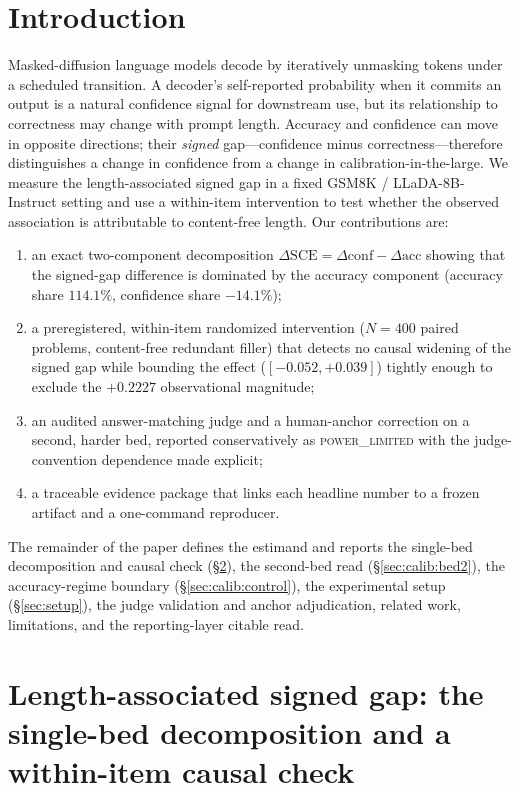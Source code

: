 \documentclass{article}
\begin{document}
\section{Introduction}
\label{sec:intro}
Masked-diffusion language models decode by iteratively unmasking tokens under a
scheduled transition.  A decoder's self-reported probability when it commits an output
is a natural confidence signal for downstream use, but its relationship to correctness
may change with prompt length.  Accuracy and confidence can move in opposite directions;
their \emph{signed} gap---confidence minus correctness---therefore distinguishes a
change in confidence from a change in calibration-in-the-large.  We measure the
length-associated signed gap in a fixed GSM8K \citep{cobbe2021gsm8k} /
LLaDA-8B-Instruct \citep{nie2025large} setting and use a within-item intervention to test
whether the observed association is attributable to content-free length.  Our
contributions are:
\begin{enumerate}
\item an exact two-component decomposition $\Delta\mathrm{SCE}=\Delta\mathrm{conf}-\Delta\mathrm{acc}$
showing that the signed-gap difference is dominated by the accuracy component
(accuracy share $114.1\%$, confidence share $-14.1\%$);
\item a preregistered, within-item randomized intervention
($N{=}400$ paired problems, content-free redundant filler) that detects no causal
widening of the signed gap while bounding the effect
($[-0.052,+0.039]$) tightly enough to exclude the $+0.2227$ observational magnitude;
\item an audited answer-matching judge and a human-anchor correction on a second,
harder bed, reported conservatively as \textsc{power\_limited} with the
judge-convention dependence made explicit;
\item a traceable evidence package that links each headline number to a frozen artifact
and a one-command reproducer.
\end{enumerate}
The remainder of the paper defines the estimand and reports the single-bed
decomposition and causal check (\S\ref{sec:calib}), the second-bed read
(\S\ref{sec:calib:bed2}), the accuracy-regime boundary (\S\ref{sec:calib:control}),
the experimental setup (\S\ref{sec:setup}), the judge validation and anchor
adjudication, related work, limitations, and the reporting-layer citable read.

\section{Length-associated signed gap: the single-bed decomposition and a within-item causal check}
\label{sec:calib}
\end{document}
